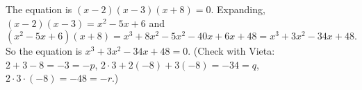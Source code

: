 The equation is $(x-2)(x-3)(x+8)=0$. Expanding, $(x-2)(x-3)=x^2-5x+6$ and
\[
(x^2-5x+6)(x+8)=x^3+8x^2-5x^2-40x+6x+48=x^3+3x^2-34x+48 .
\]
So the equation is $\boxed{x^3+3x^2-34x+48=0}$. (Check with Vieta: $2+3-8=-3=-p$, $2\cdot3+2(-8)+3(-8)=-34=q$, $2\cdot3\cdot(-8)=-48=-r$.)
